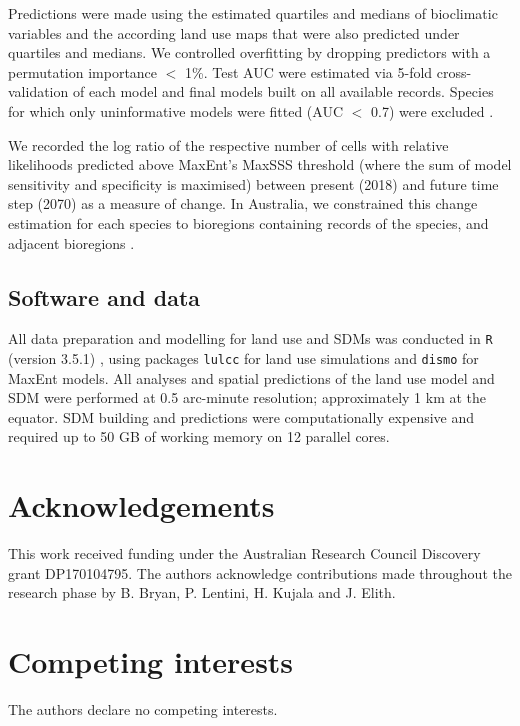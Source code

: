 \documentclass[titlesmallcaps,copyrightpage]{uomthesis}\usepackage[]{graphicx}\usepackage[]{color}
\begin{document}
Predictions were made using the estimated quartiles and medians of bioclimatic variables and the according land use maps that were also predicted under quartiles and medians. We controlled overfitting by dropping predictors with a permutation importance  $<$ 1\%. Test AUC were estimated via 5-fold cross-validation of each model and final models built on all available records. Species for which only uninformative models were fitted (AUC $<$ 0.7) were excluded \citep{baldwin_use_2009}.

We recorded the log ratio of the respective number of cells with relative likelihoods predicted above MaxEnt's MaxSSS threshold \citep{liu_selection_2016} (where the sum of model sensitivity and specificity is maximised) between present (2018) and future time step (2070) as a measure of change. In Australia, we constrained this change estimation for each species to bioregions containing records of the species, and adjacent bioregions \citep{moran-ordonez_evaluating_2016}.

\subsection{Software and data}

All data preparation and modelling for land use and SDMs was conducted in \texttt{R} (version 3.5.1) \citep{r_development_core_team_r_2008}, using packages \texttt{lulcc} \citep{moulds_open_2015} for land use simulations and \texttt{dismo} \citep{hijmans_package_2011} for MaxEnt \citep{phillips_internet_nodate} models. All analyses and spatial predictions of the land use model and SDM were performed at 0.5 arc-minute resolution; approximately 1 km at the equator. SDM building and predictions were computationally expensive and required up to 50 GB of working memory on 12 parallel cores.

\section{Acknowledgements}
This work received funding under the Australian Research Council Discovery grant DP170104795. The authors acknowledge contributions made throughout the research phase by B. Bryan, P. Lentini, H. Kujala and J. Elith.

\section{Competing interests}
The authors declare no competing interests.
\end{document}
